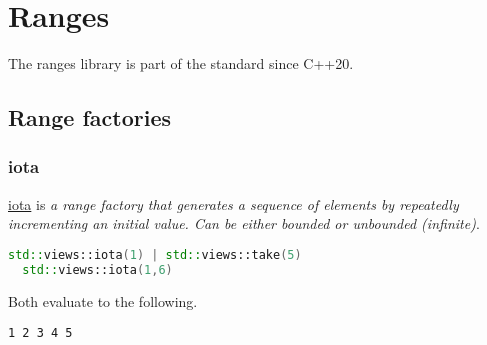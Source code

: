 \section{Ranges}
The ranges library \cite{cppreference_ranges} is part of the standard since
C++20.

\subsection{Range factories}
\subsubsection{iota}
\href{https://en.cppreference.com/w/cpp/ranges/iota_view}{iota} is
\emph{a range factory that generates a sequence of elements by repeatedly
  incrementing an initial value. Can be either bounded or unbounded (infinite)}.

\begin{lstlisting}[language=C++, caption={iota example}, label={lst:ex_iota}]
  std::views::iota(1) | std::views::take(5)
  std::views::iota(1,6) \end{lstlisting}

Both evaluate to the following.

\begin{lstlisting}[language={}]
  1 2 3 4 5 \end{lstlisting}
